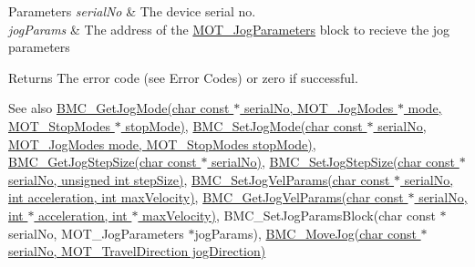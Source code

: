 \begin{DoxyParams}{Parameters}
{\em serial\+No} & The device serial no. \\
\hline
{\em jog\+Params} & The address of the \hyperlink{struct_m_o_t___jog_parameters}{M\+O\+T\+\_\+\+Jog\+Parameters} block to recieve the jog parameters \\
\hline
\end{DoxyParams}
\begin{DoxyReturn}{Returns}
The error code (see Error Codes) or zero if successful. 
\end{DoxyReturn}
\begin{DoxySeeAlso}{See also}
\hyperlink{group___t_cube_brushless_motor_gafc92fe606b9cd874d7f28d7791e8a06e}{B\+M\+C\+\_\+\+Get\+Jog\+Mode(char const $\ast$ serial\+No, M\+O\+T\+\_\+\+Jog\+Modes $\ast$ mode, M\+O\+T\+\_\+\+Stop\+Modes $\ast$ stop\+Mode)}, \hyperlink{group___t_cube_brushless_motor_ga5cc6ed2932a1761531546d41a9240136}{B\+M\+C\+\_\+\+Set\+Jog\+Mode(char const $\ast$ serial\+No, M\+O\+T\+\_\+\+Jog\+Modes mode, M\+O\+T\+\_\+\+Stop\+Modes stop\+Mode)}, \hyperlink{group___t_cube_brushless_motor_ga2a2db2c5c7f24bbff73f17af4e10bdd1}{B\+M\+C\+\_\+\+Get\+Jog\+Step\+Size(char const $\ast$ serial\+No)}, \hyperlink{group___t_cube_brushless_motor_gaeff03c620c9c2a0719c58dc9d97ed8c3}{B\+M\+C\+\_\+\+Set\+Jog\+Step\+Size(char const $\ast$ serial\+No, unsigned int step\+Size)}, \hyperlink{group___t_cube_brushless_motor_ga5344f441c200c330ef267401054c307e}{B\+M\+C\+\_\+\+Set\+Jog\+Vel\+Params(char const $\ast$ serial\+No, int acceleration, int max\+Velocity)}, \hyperlink{group___t_cube_brushless_motor_ga096d9f530ba9e298f7c687a891b6182f}{B\+M\+C\+\_\+\+Get\+Jog\+Vel\+Params(char const $\ast$ serial\+No, int $\ast$ acceleration, int $\ast$ max\+Velocity)}, B\+M\+C\+\_\+\+Set\+Jog\+Params\+Block(char const $\ast$ serial\+No, M\+O\+T\+\_\+\+Jog\+Parameters $\ast$jog\+Params), \hyperlink{group___t_cube_brushless_motor_gae7854ca7daacf191f792adff135f1dcd}{B\+M\+C\+\_\+\+Move\+Jog(char const $\ast$ serial\+No, M\+O\+T\+\_\+\+Travel\+Direction jog\+Direction)}


\end{DoxySeeAlso}

\begin{DoxyCodeInclude}
\end{DoxyCodeInclude}
